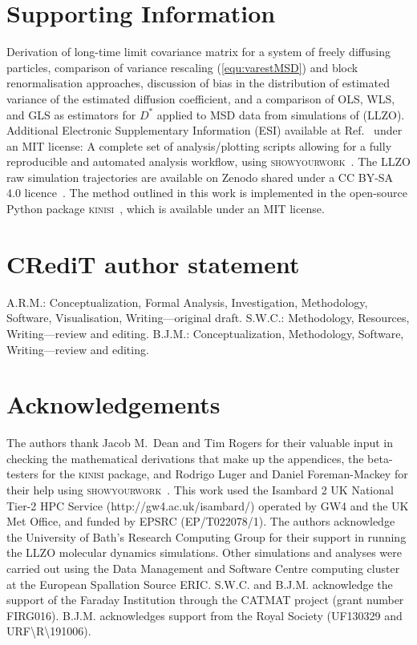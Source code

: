 \documentclass[reprint,superscriptaddress,nobibnotes,amsmath,amssymb,aps,prx,hidelinks]{revtex4-2}
\newcommand{\D}{\ensuremath{D^*}}
\begin{document}
\section*{Supporting Information}

Derivation of long-time limit covariance matrix for a system of freely diffusing particles, comparison of variance rescaling (\cref{equ:varestMSD}) and block renormalisation approaches, discussion of bias in the distribution of estimated variance of the estimated diffusion coefficient, and a comparison of OLS, WLS, and GLS as estimators for $\D$ applied to MSD data from simulations of  (LLZO).
Additional Electronic Supplementary Information (ESI) available at Ref.~\cite{mccluskey_github_2022} under an MIT license: A complete set of analysis/plotting scripts allowing for a fully reproducible and automated analysis workflow, using \textsc{showyourwork}~\cite{luger_showyourwork_2021}.
The LLZO raw simulation trajectories are available on Zenodo shared under a CC BY-SA 4.0 licence~\cite{coles_llzo_zenodo_2022}.
The method outlined in this work is implemented in the open-source Python package \textsc{kinisi}~\cite{McCluskey2024}, which is available under an MIT license.

\section*{CR\lowercase{e}d\lowercase{i}T author statement}

A.R.M.: Conceptualization, Formal Analysis, Investigation, Methodology, Software, Visualisation, Writing---original draft.
S.W.C.: Methodology, Resources, Writing---review and editing.
B.J.M.: Conceptualization, Methodology, Software, Writing---review and editing.

\section*{Acknowledgements}

The authors thank Jacob M.\ Dean and Tim Rogers for their valuable input in checking the mathematical derivations that make up the appendices, the beta-testers for the \textsc{kinisi} package, and Rodrigo Luger and Daniel Foreman-Mackey for their help using \textsc{showyourwork}~\cite{luger_showyourwork_2021}.
This work used the Isambard 2 UK National Tier-2 HPC Service (http://gw4.ac.uk/isambard/) operated by GW4 and the UK Met Office, and funded by EPSRC (EP/T022078/1).
The authors acknowledge the University of Bath's Research Computing Group for their support in running the LLZO molecular dynamics simulations.
Other simulations and analyses were carried out using the Data Management and Software Centre computing cluster at the European Spallation Source ERIC.
S.W.C. and B.J.M. acknowledge the support of the Faraday Institution through the CATMAT project (grant number FIRG016). 
B.J.M. acknowledges support from the Royal Society (UF130329 and URF\textbackslash R\textbackslash 191006). 
\end{document}
